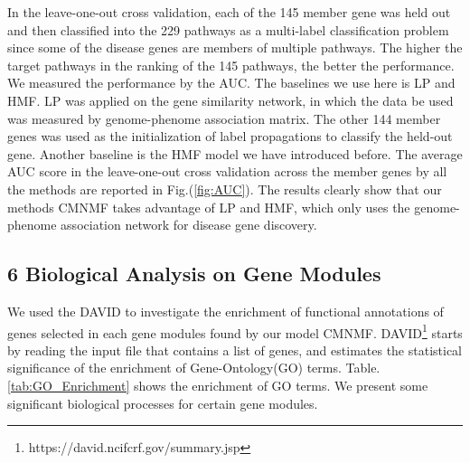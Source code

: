 \documentclass{bmcart}
\begin{document}
 In the leave-one-out cross validation, each of the 145 member gene was held out and then classified into the 229 pathways as a multi-label classification problem since some of the disease genes are
members of multiple pathways. The higher the target pathways in the ranking of the 145 pathways, the better the performance. We measured the performance by the AUC. The baselines we use here is LP and HMF. LP was applied on the gene similarity network, in which the data be used was measured by genome-phenome association matrix. The other 144 member genes was used as the initialization of label propagations to classify the held-out gene. Another baseline is the HMF model we have introduced before. The average AUC score in the leave-one-out cross validation across the  member genes by all the methods are reported in Fig.(\ref{fig:AUC}). The results clearly show that our methods CMNMF takes advantage of LP and HMF, which only uses the genome-phenome association network for disease gene discovery.

\subsection*{\textbf{6 Biological Analysis on Gene Modules}}%

We used the DAVID\cite{Dennis2003} to investigate the enrichment of functional annotations of genes selected in each gene modules found by our model CMNMF. DAVID\footnote{https://david.ncifcrf.gov/summary.jsp} starts by reading the input file that contains a list of genes, and estimates the statistical significance of the enrichment of Gene-Ontology(GO) terms.
Table.\ref{tab:GO_Enrichment} shows the enrichment of GO terms. We present some significant biological processes for certain  gene modules.
\end{document}
